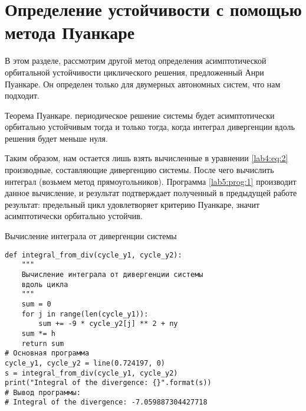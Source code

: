 \chapter{Определение устойчивости с помощью метода Пуанкаре}\label{lab5}

В этом разделе, рассмотрим другой метод определения асимптотической орбитальной
устойчивости циклического решения, предложенный Анри Пуанкаре. Он определен
только для двумерных автономных систем, что нам подходит.

\begin{theorem}
    Теорема Пуанкаре.
    периодическое решение системы будет асимптотически
    орбитально устойчивым тогда и только тогда, когда интеграл дивергенции вдоль
    решения будет меньше нуля.
\end{theorem}

Таким образом, нам остается лишь взять вычисленные в уравнении \ref{lab4:eq:2}
производные, составляющие дивергенцию системы. После чего вычислить интеграл
(возьмем метод прямоугольников). Программа \ref{lab5:prog:1} производит данное
вычисление, и результат подтверждает полученный в предыдущей работе результат:
предельный цикл удовлетворяет критерию Пуанкаре, значит асимптотически орбитально
устойчив.

\begin{program}
    \caption{Вычисление интеграла от дивергенции системы}
    \label{lab5:prog:1}
    \begin{verbatim}
def integral_from_div(cycle_y1, cycle_y2):
    """
    Вычисление интеграла от дивергенции системы
    вдоль цикла
    """
    sum = 0
    for j in range(len(cycle_y1)):
        sum += -9 * cycle_y2[j] ** 2 + ny
    sum *= h
    return sum
# Основная программа
cycle_y1, cycle_y2 = line(0.724197, 0)
s = integral_from_div(cycle_y1, cycle_y2)
print("Integral of the divergence: {}".format(s))
# Вывод программы:
# Integral of the divergence: -7.059887304427718
    \end{verbatim}
\end{program}